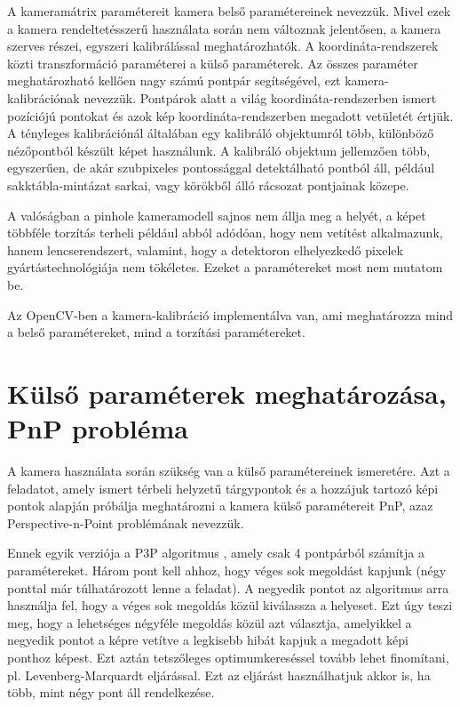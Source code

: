 A kameramátrix paramétereit kamera belső paramétereinek nevezzük. Mivel ezek a kamera rendeltetésszerű használata során nem változnak jelentősen, a kamera szerves részei, egyszeri kalibrálással meghatározhatók. A koordináta-rendszerek közti transzformáció paraméterei a külső paraméterek. Az összes paraméter meghatározható kellően nagy számú pontpár segítségével, ezt kamera-kalibrációnak nevezzük. Pontpárok alatt a világ koordináta-rendszerben ismert pozíciójú pontokat és azok kép koordináta-rendszerben megadott vetületét értjük. A tényleges kalibrációnál általában egy kalibráló objektumról több, különböző nézőpontból készült képet használunk. A kalibráló objektum jellemzően több, egyszerűen, de akár szubpixeles pontossággal detektálható pontból áll, például sakktábla-mintázat sarkai, vagy körökből álló rácsozat pontjainak közepe.

A valóságban a pinhole kameramodell sajnos nem állja meg a helyét, a képet többféle torzítás terheli például abból adódóan, hogy nem vetítést alkalmazunk, hanem lencserendszert, valamint, hogy a detektoron elhelyezkedő pixelek gyártástechnológiája nem tökéletes. Ezeket a paramétereket most nem mutatom be.

Az OpenCV-ben a kamera-kalibráció implementálva van, ami meghatározza mind a belső paramétereket, mind a torzítási paramétereket.

\section{Külső paraméterek meghatározása, PnP probléma}

	A kamera használata során szükség van a külső paramétereinek ismeretére. Azt a feladatot, amely ismert térbeli helyzetű tárgypontok és a hozzájuk tartozó képi pontok alapján próbálja meghatározni a kamera külső paramétereit PnP, azaz Perspective-n-Point problémának nevezzük. 
	
Ennek egyik verziója a P3P algoritmus \cite{XiaoPnP}, amely csak 4 pontpárból számítja a paramétereket. Három pont kell ahhoz, hogy véges sok megoldást kapjunk (négy ponttal már túlhatározott lenne a feladat). A negyedik pontot az algoritmus arra használja fel, hogy a véges sok megoldás közül kiválassza a helyeset. Ezt úgy teszi meg, hogy a lehetséges négyféle megoldás közül azt választja, amelyikkel a negyedik pontot a képre vetítve a legkisebb hibát kapjuk a megadott képi ponthoz képest. Ezt aztán tetszőleges optimumkereséssel tovább lehet finomítani, pl. Levenberg-Marquardt eljárással. Ezt az eljárást használhatjuk akkor is, ha több, mint négy pont áll rendelkezése.

